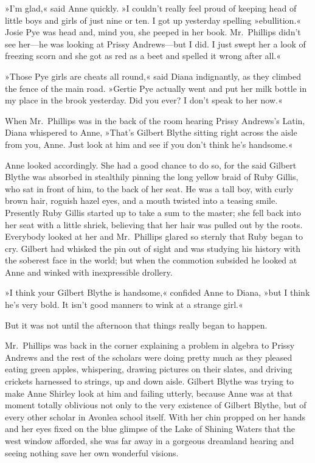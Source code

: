 »I'm glad,« said Anne quickly. »I couldn't really feel proud of keeping head of little boys and girls of just nine or ten. I got up yesterday spelling »ebullition.« Josie Pye was head and, mind you, she peeped in her book. Mr.~Phillips didn't see her—he was looking at Prissy Andrews—but I did. I just swept her a look of freezing scorn and she got as red as a beet and spelled it wrong after all.«

»Those Pye girls are cheats all round,« said Diana indignantly, as they climbed the fence of the main road. »Gertie Pye actually went and put her milk bottle in my place in the brook yesterday. Did you ever? I don't speak to her now.«

When Mr.~Phillips was in the back of the room hearing Prissy Andrews's Latin, Diana whispered to Anne, »That's Gilbert Blythe sitting right across the aisle from you, Anne. Just look at him and see if you don't think he's handsome.«

Anne looked accordingly. She had a good chance to do so, for the said Gilbert Blythe was absorbed in stealthily pinning the long yellow braid of Ruby Gillis, who sat in front of him, to the back of her seat. He was a tall boy, with curly brown hair, roguish hazel eyes, and a mouth twisted into a teasing smile. Presently Ruby Gillis started up to take a sum to the master; she fell back into her seat with a little shriek, believing that her hair was pulled out by the roots. Everybody looked at her and Mr.~Phillips glared so sternly that Ruby began to cry. Gilbert had whisked the pin out of sight and was studying his history with the soberest face in the world; but when the commotion subsided he looked at Anne and winked with inexpressible drollery.

»I think your Gilbert Blythe is handsome,« confided Anne to Diana, »but I think he's very bold. It isn't good manners to wink at a strange girl.«

But it was not until the afternoon that things really began to happen.

Mr.~Phillips was back in the corner explaining a problem in algebra to Prissy Andrews and the rest of the scholars were doing pretty much as they pleased eating green apples, whispering, drawing pictures on their slates, and driving crickets harnessed to strings, up and down aisle. Gilbert Blythe was trying to make Anne Shirley look at him and failing utterly, because Anne was at that moment totally oblivious not only to the very existence of Gilbert Blythe, but of every other scholar in Avonlea school itself. With her chin propped on her hands and her eyes fixed on the blue glimpse of the Lake of Shining Waters that the west window afforded, she was far away in a gorgeous dreamland hearing and seeing nothing save her own wonderful visions.

